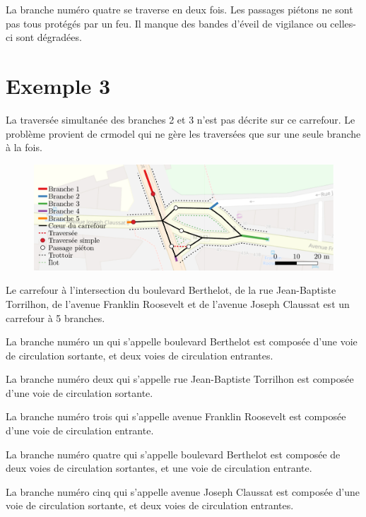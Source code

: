 \begin{appendix}
La branche numéro quatre se traverse en deux fois. Les passages piétons ne sont pas tous protégés par un feu. Il manque des bandes d'éveil de vigilance ou celles-ci sont dégradées.

\newpage
\section*{Exemple 3}

La traversée simultanée des branches 2 et 3 n'est pas décrite sur ce carrefour. Le problème provient de crmodel qui ne gère les traversées que sur une seule branche à la fois.

\begin{figure}[ht]
    \centering
    \includegraphics[width=\textwidth]{images/annexes/carrefour_manon.pdf}
    \label{fig:exemple3}
\end{figure}

Le carrefour à l'intersection du boulevard Berthelot, de la rue Jean-Baptiste Torrilhon, de l'avenue Franklin Roosevelt et de l'avenue Joseph Claussat est un carrefour à 5 branches.

\newpar{}

La branche numéro un qui s'appelle boulevard Berthelot est composée d'une voie de circulation sortante, et deux voies de circulation entrantes.

La branche numéro deux qui s'appelle rue Jean-Baptiste Torrilhon est composée d'une voie de circulation sortante.

La branche numéro trois qui s'appelle avenue Franklin Roosevelt est composée d'une voie de circulation entrante.

La branche numéro quatre qui s'appelle boulevard Berthelot est composée de deux voies de circulation sortantes, et une voie de circulation entrante.

La branche numéro cinq qui s'appelle avenue Joseph Claussat est composée d'une voie de circulation sortante, et deux voies de circulation entrantes.

\newpar{}


\end{appendix}

